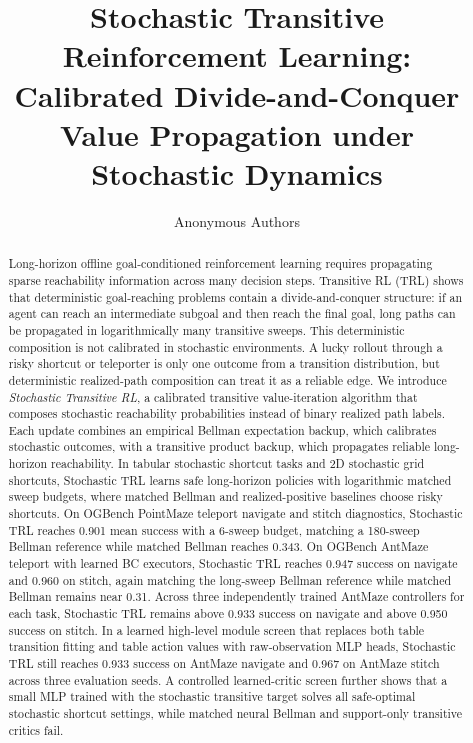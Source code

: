 \documentclass[10pt]{article}
\title{Stochastic Transitive Reinforcement Learning:\\
Calibrated Divide-and-Conquer Value Propagation under Stochastic Dynamics}
\author{Anonymous Authors}
\date{}
\begin{document}
\maketitle

\begin{abstract}
Long-horizon offline goal-conditioned reinforcement learning requires
propagating sparse reachability information across many decision steps.
Transitive RL (TRL) shows that deterministic goal-reaching problems contain a
divide-and-conquer structure: if an agent can reach an intermediate subgoal
and then reach the final goal, long paths can be propagated in logarithmically
many transitive sweeps. This deterministic composition is not calibrated in
stochastic environments. A lucky rollout through a risky shortcut or teleporter
is only one outcome from a transition distribution, but deterministic
realized-path composition can treat it as a reliable edge. We introduce
\emph{Stochastic Transitive RL}, a calibrated transitive value-iteration
algorithm that composes stochastic reachability probabilities instead of
binary realized path labels. Each update combines an empirical Bellman
expectation backup, which calibrates stochastic outcomes, with a transitive
product backup, which propagates reliable long-horizon reachability. In
tabular stochastic shortcut tasks and 2D stochastic grid shortcuts, Stochastic
TRL learns safe long-horizon policies with logarithmic matched sweep budgets,
where matched Bellman and realized-positive baselines choose risky shortcuts.
On OGBench PointMaze teleport navigate and stitch diagnostics, Stochastic TRL
reaches 0.901 mean success with a 6-sweep budget, matching a 180-sweep Bellman
reference while matched Bellman reaches 0.343. On OGBench AntMaze teleport
with learned BC executors, Stochastic TRL reaches 0.947 success on navigate
and 0.960 on stitch, again matching the long-sweep Bellman reference while
matched Bellman remains near 0.31. Across three independently trained AntMaze
controllers for each task, Stochastic TRL remains above 0.933 success on
navigate and above 0.950 success on stitch. In a learned high-level module
screen that replaces both table transition fitting and table action values
with raw-observation MLP heads, Stochastic TRL still reaches 0.933 success on
AntMaze navigate and 0.967 on AntMaze stitch across three evaluation seeds.
A controlled learned-critic screen further shows that a small MLP trained with
the stochastic transitive target solves all safe-optimal stochastic shortcut
settings, while matched neural Bellman and support-only transitive critics fail.
\end{abstract}
\end{document}
